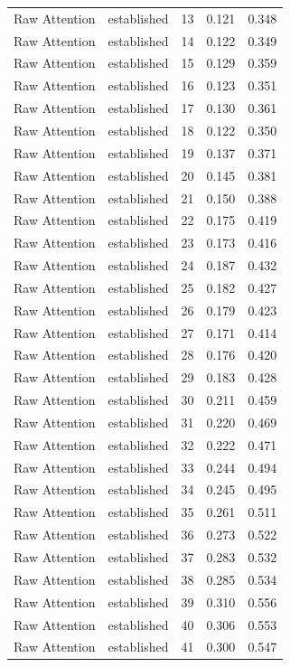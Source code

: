 \begin{tabular}{llrrr}
Raw Attention & established & 13 & 0.121 & 0.348 \\
Raw Attention & established & 14 & 0.122 & 0.349 \\
Raw Attention & established & 15 & 0.129 & 0.359 \\
Raw Attention & established & 16 & 0.123 & 0.351 \\
Raw Attention & established & 17 & 0.130 & 0.361 \\
Raw Attention & established & 18 & 0.122 & 0.350 \\
Raw Attention & established & 19 & 0.137 & 0.371 \\
Raw Attention & established & 20 & 0.145 & 0.381 \\
Raw Attention & established & 21 & 0.150 & 0.388 \\
Raw Attention & established & 22 & 0.175 & 0.419 \\
Raw Attention & established & 23 & 0.173 & 0.416 \\
Raw Attention & established & 24 & 0.187 & 0.432 \\
Raw Attention & established & 25 & 0.182 & 0.427 \\
Raw Attention & established & 26 & 0.179 & 0.423 \\
Raw Attention & established & 27 & 0.171 & 0.414 \\
Raw Attention & established & 28 & 0.176 & 0.420 \\
Raw Attention & established & 29 & 0.183 & 0.428 \\
Raw Attention & established & 30 & 0.211 & 0.459 \\
Raw Attention & established & 31 & 0.220 & 0.469 \\
Raw Attention & established & 32 & 0.222 & 0.471 \\
Raw Attention & established & 33 & 0.244 & 0.494 \\
Raw Attention & established & 34 & 0.245 & 0.495 \\
Raw Attention & established & 35 & 0.261 & 0.511 \\
Raw Attention & established & 36 & 0.273 & 0.522 \\
Raw Attention & established & 37 & 0.283 & 0.532 \\
Raw Attention & established & 38 & 0.285 & 0.534 \\
Raw Attention & established & 39 & 0.310 & 0.556 \\
Raw Attention & established & 40 & 0.306 & 0.553 \\
Raw Attention & established & 41 & 0.300 & 0.547 \\

\end{tabular}
